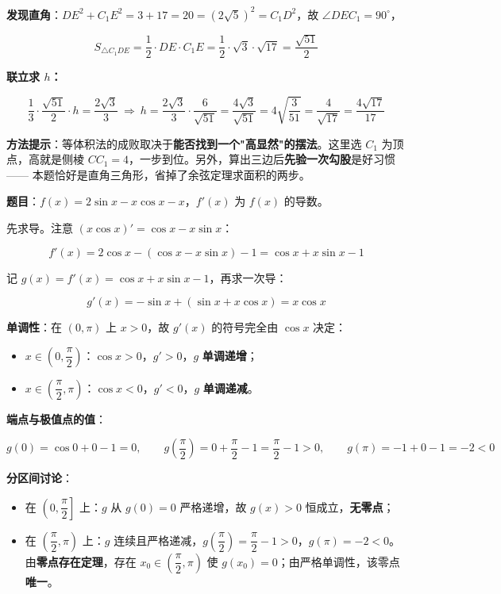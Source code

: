 \textbf{发现直角}：$DE^{2}+C_1E^{2}=3+17=20=\left(2\sqrt5\right)^{2}=C_1D^{2}$，故 $\angle DEC_1=90^\circ$，

\[S_{\triangle C_1DE}=\frac12\cdot DE\cdot C_1E=\frac12\cdot\sqrt3\cdot\sqrt{17}=\frac{\sqrt{51}}2\]

\textbf{联立求 $h$：}

\[\frac13\cdot\frac{\sqrt{51}}2\cdot h=\frac{2\sqrt3}3\ \Longrightarrow\ h=\frac{2\sqrt3}3\cdot\frac6{\sqrt{51}}=\frac{4\sqrt3}{\sqrt{51}}=4\sqrt{\frac3{51}}=\frac4{\sqrt{17}}=\frac{4\sqrt{17}}{17}\]


\begin{gktip}
\textbf{方法提示}：等体积法的成败取决于\textbf{能否找到一个"高显然"的摆法}。这里选 $C_1$ 为顶点，高就是侧棱 $CC_1=4$，一步到位。另外，算出三边后\textbf{先验一次勾股}是好习惯 —— 本题恰好是直角三角形，省掉了余弦定理求面积的两步。
\end{gktip}

\par\medskip


\textbf{题目}：$f(x)=2\sin x-x\cos x-x$，$f'(x)$ 为 $f(x)$ 的导数。


先求导。注意 $(x\cos x)'=\cos x-x\sin x$：

\[f'(x)=2\cos x-(\cos x-x\sin x)-1=\cos x+x\sin x-1\]

记 $g(x)=f'(x)=\cos x+x\sin x-1$，再求一次导：

\[g'(x)=-\sin x+(\sin x+x\cos x)=x\cos x\]

\textbf{单调性}：在 $(0,\pi)$ 上 $x>0$，故 $g'(x)$ 的符号完全由 $\cos x$ 决定：

\begin{itemize}
\item $x\in\left(0,\dfrac\pi2\right)$：$\cos x>0$，$g'>0$，$g$ \textbf{单调递增}；
\item $x\in\left(\dfrac\pi2,\pi\right)$：$\cos x<0$，$g'<0$，$g$ \textbf{单调递减}。
\end{itemize}

\textbf{端点与极值点的值}：

\[g(0)=\cos0+0-1=0,\qquad g\!\left(\frac\pi2\right)=0+\frac\pi2-1=\frac\pi2-1>0,\qquad g(\pi)=-1+0-1=-2<0\]

\textbf{分区间讨论}：

\begin{itemize}
\item 在 $\left(0,\dfrac\pi2\right]$ 上：$g$ 从 $g(0)=0$ 严格递增，故 $g(x)>0$ 恒成立，\textbf{无零点}；
\item 在 $\left(\dfrac\pi2,\pi\right)$ 上：$g$ 连续且严格递减，$g\!\left(\dfrac\pi2\right)=\dfrac\pi2-1>0$，$g(\pi)=-2<0$。由\textbf{零点存在定理}，存在 $x_0\in\left(\dfrac\pi2,\pi\right)$ 使 $g\left(x_0\right)=0$；由严格单调性，该零点\textbf{唯一}。
\end{itemize}

